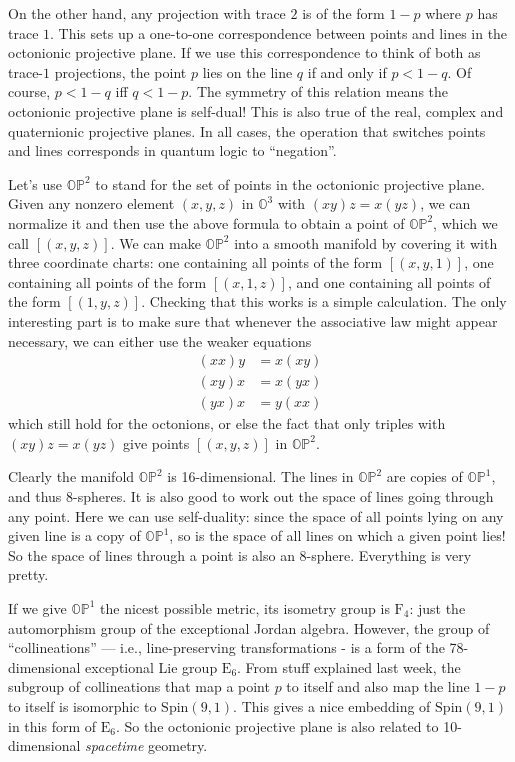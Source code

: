 \documentclass{article}
\begin{document}
On the other hand, any projection with trace \(2\) is of the form
\(1-p\) where \(p\) has trace \(1\). This sets up a one-to-one
correspondence between points and lines in the octonionic projective
plane. If we use this correspondence to think of both as trace-\(1\)
projections, the point \(p\) lies on the line \(q\) if and only if
\(p < 1 - q\). Of course, \(p < 1 - q\) iff \(q < 1 - p\). The symmetry
of this relation means the octonionic projective plane is self-dual!
This is also true of the real, complex and quaternionic projective
planes. In all cases, the operation that switches points and lines
corresponds in quantum logic to ``negation''.

Let's use \(\mathbb{OP}^2\) to stand for the set of points in the
octonionic projective plane. Given any nonzero element \((x,y,z)\) in
\(\mathbb{O}^3\) with \((xy)z = x(yz)\), we can normalize it and then
use the above formula to obtain a point of \(\mathbb{OP}^2\), which we
call \([(x,y,z)]\). We can make \(\mathbb{OP}^2\) into a smooth manifold
by covering it with three coordinate charts: one containing all points
of the form \([(x,y,1)]\), one containing all points of the form
\([(x,1,z)]\), and one containing all points of the form \([(1,y,z)]\).
Checking that this works is a simple calculation. The only interesting
part is to make sure that whenever the associative law might appear
necessary, we can either use the weaker equations \[
  \begin{aligned}
    (xx)y &= x(xy) 
  \\(xy)x &= x(yx)
  \\(yx)x &= y(xx)
  \end{aligned}
\] which still hold for the octonions, or else the fact that only
triples with \((xy)z = x(yz)\) give points \([(x,y,z)]\) in
\(\mathbb{OP}^2\).

Clearly the manifold \(\mathbb{OP}^2\) is 16-dimensional. The lines in
\(\mathbb{OP}^2\) are copies of \(\mathbb{OP}^1\), and thus 8-spheres.
It is also good to work out the space of lines going through any point.
Here we can use self-duality: since the space of all points lying on any
given line is a copy of \(\mathbb{OP}^1\), so is the space of all lines
on which a given point lies! So the space of lines through a point is
also an 8-sphere. Everything is very pretty.

If we give \(\mathbb{OP}^1\) the nicest possible metric, its isometry
group is \(\mathrm{F}_4\): just the automorphism group of the
exceptional Jordan algebra. However, the group of ``collineations'' ---
i.e., line-preserving transformations - is a form of the 78-dimensional
exceptional Lie group \(\mathrm{E}_6\). From stuff explained last week,
the subgroup of collineations that map a point \(p\) to itself and also
map the line \(1 - p\) to itself is isomorphic to
\(\mathrm{Spin}(9,1)\). This gives a nice embedding of
\(\mathrm{Spin}(9,1)\) in this form of \(\mathrm{E}_6\). So the
octonionic projective plane is also related to 10-dimensional
\emph{spacetime} geometry.
\end{document}
